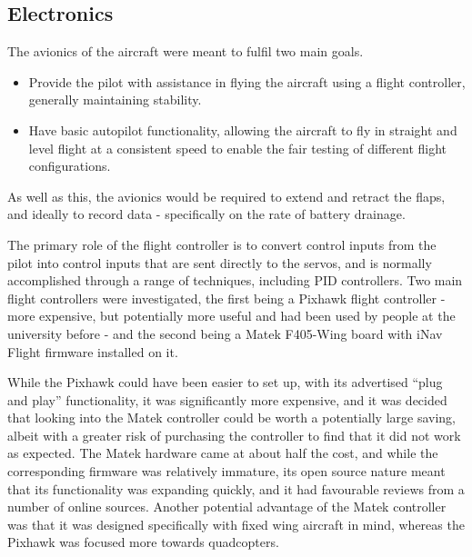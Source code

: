 \documentclass[../../main.tex]{subfiles}
\begin{document}
\subsection{Electronics} \label{sec:design-process:final-design-proposal:electronics}


The avionics of the aircraft were meant to fulfil two main goals.

\begin{itemize}
    \item Provide the pilot with assistance in flying the aircraft using a flight controller, generally maintaining stability. 
    \item Have basic autopilot functionality, allowing the aircraft to fly in straight and level flight at a consistent speed to enable the fair testing of different flight configurations. 
\end{itemize}

As well as this, the avionics would be required to extend and retract the flaps, and ideally to record data - specifically on the rate of battery drainage. 

The primary role of the flight controller is to convert control inputs from the pilot into control inputs that are sent directly to the servos, and is normally accomplished through a range of techniques, including PID controllers.
Two main flight controllers were investigated, the first being a Pixhawk flight controller - more expensive, but potentially more useful and had been used by people at the university before - and the second being a Matek F405-Wing board with iNav Flight firmware installed on it. 

While the Pixhawk could have been easier to set up, with its advertised “plug and play” functionality, it was significantly more expensive, and it was decided that looking into the Matek controller could be worth a potentially large saving, albeit with a greater risk of purchasing the controller to find that it did not work as expected.
The Matek hardware came at about half the cost, and while the corresponding firmware was relatively immature, its open source nature meant that its functionality was expanding quickly, and it had favourable reviews from a number of online sources.
Another potential advantage of the Matek controller was that it was designed specifically with fixed wing aircraft in mind, whereas the Pixhawk was focused more towards quadcopters. 

\end{document}
